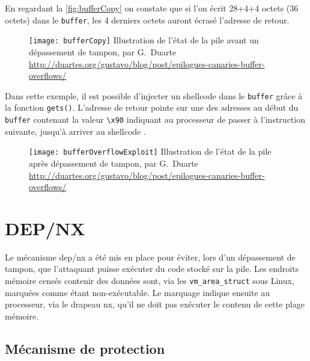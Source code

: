 En regardant la \autoref{fig:bufferCopy} on constate que si l'on écrit 28+4+4 octets  (36 octets) dans le \texttt{buffer}, les 4 derniers octets auront écrasé l'adresse de retour.

\begin{figure}[H]
	\centering
	\texttt{[image: bufferCopy]}
	{Illustration de l'état de la pile avant un dépassement de tampon, par G.~Duarte}
	{\url{http://duartes.org/gustavo/blog/post/epilogues-canaries-buffer-overflows/}}
	\label{fig:bufferCopy}
\end{figure}

Dans cette exemple, il est possible d'injecter un \og shellcode \fg dans le \texttt{buffer} grâce à la fonction \texttt{gets()}. L'adresse de retour
pointe sur une des adresses au début du \texttt{buffer} contenant la valeur \texttt{\textbackslash x90} indiquant au processeur de passer à l'instruction suivante, jusqu'à arriver au \og shellcode \fg.

\begin{figure}[H]
	\centering
	\texttt{[image: bufferOverflowExploit]}
	{Illustration de l'état de la pile après dépassement de tampon, par G.~Duarte}
	{\url{http://duartes.org/gustavo/blog/post/epilogues-canaries-buffer-overflows/}}
	\label{fig:bufferOverflowExploit}
\end{figure}

\vfill

\section{DEP/NX}

Le mécanisme \gls{dep}/\gls{nx} a été mis en place pour éviter, lors d'un dépassement de tampon, que l'attaquant puisse exécuter du code stocké sur la pile. Les endroits mémoire censés contenir des données sont, via les \texttt{vm_area_struct} sous Linux, marquées comme étant non-exécutable. Le marquage indique ensuite au processeur, via le drapeau \gls{nx}, qu'il ne doit pas exécuter le contenu de cette plage mémoire.

\subsection{Mécanisme de protection}

